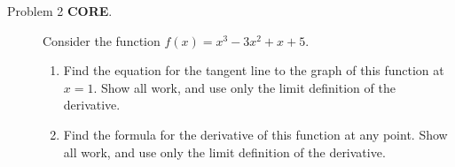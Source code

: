 \documentclass[addpoints]{exam}
\begin{document}
\begin{description}


\hrulefill


	\item[Problem 2 \textbf{CORE}.] Consider the function $f(x) = x^3 - 3x^2 + x + 5$. 
		\begin{enumerate}
		\item Find the equation for the tangent line to the graph of this function at $x = 1$. Show all work, and use only the limit definition of the derivative. 
		\item Find the formula for the derivative of this function at any point. Show all work, and use only the limit definition of the derivative. 
		\end{enumerate}




\end{description}
\end{document}

